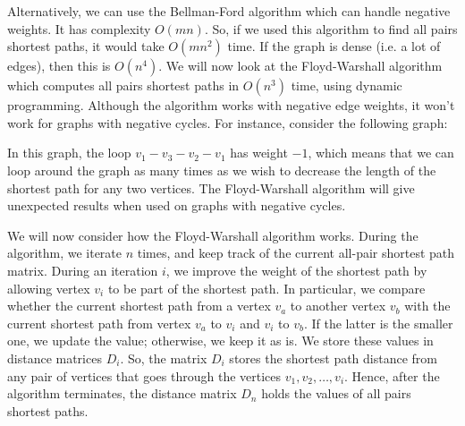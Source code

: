 \documentclass[a4paper, openany]{memoir}
\begin{document}
    Alternatively, we can use the Bellman-Ford algorithm which can handle negative weights. It has complexity $O(mn)$. So, if we used this algorithm to find all pairs shortest paths, it would take $O(mn^2)$ time. If the graph is dense (i.e. a lot of edges), then this is $O(n^4)$. We will now look at the Floyd-Warshall algorithm which computes all pairs shortest paths in $O(n^3)$ time, using dynamic programming. Although the algorithm works with negative edge weights, it won't work for graphs with negative cycles. For instance, consider the following graph:
    \begin{figure}[H]
        \centering
    \end{figure}
    \noindent In this graph, the loop $v_1 - v_3 - v_2 - v_1$ has weight $-1$, which means that we can loop around the graph as many times as we wish to decrease the length of the shortest path for any two vertices. The Floyd-Warshall algorithm will give unexpected results when used on graphs with negative cycles.
    
    We will now consider how the Floyd-Warshall algorithm works. During the algorithm, we iterate $n$ times, and keep track of the current all-pair shortest path matrix. During an iteration $i$, we improve the weight of the shortest path by allowing vertex $v_i$ to be part of the shortest path. In particular, we compare whether the current shortest path from a vertex $v_a$ to another vertex $v_b$ with the current shortest path from vertex $v_a$ to $v_i$ and $v_i$ to $v_b$. If the latter is the smaller one, we update the value; otherwise, we keep it as is. We store these values in distance matrices $D_i$. So, the matrix $D_i$ stores the shortest path distance from any pair of vertices that goes through the vertices $v_1, v_2, \dots, v_i$. Hence, after the algorithm terminates, the distance matrix $D_n$ holds the values of all pairs shortest paths.
\end{document}
